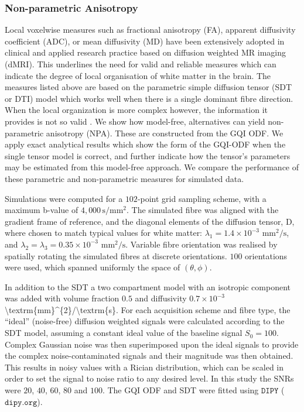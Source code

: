 \documentclass{bioinfo}
\begin{document}
\subsubsection{Non-parametric Anisotropy}

Local voxelwise measures such as fractional anisotropy (FA), apparent
diffusivity coefficient (ADC), or mean diffusivity (MD) have been
extensively adopted in clinical and applied research practice based
on diffusion weighted MR imaging (dMRI). This underlines the need
for valid and reliable measures which can indicate the degree of local
organisation of white matter in the brain. The measures listed above
are based on the parametric simple diffusion tensor (SDT or DTI) model
\cite{Basser1994} which works well when there is a single dominant
fibre direction. When the local organization is more complex however,
the information it provides is not so valid \cite{Yeh2010,Tuch2002ThesisMIT}.
We show how model-free, alternatives can yield non-parametric anisotropy
(NPA). These are constructed from the GQI ODF. We apply exact analytical
results which show the form of the GQI-ODF when the single tensor
model is correct, and further indicate how the tensor's parameters
may be estimated from this model-free approach. We compare the performance
of these parametric and non-parametric measures for simulated data.

Simulations were computed for a $102$-point grid sampling scheme,
with a maximum b-value of $4,000\,\textrm{s}/\textrm{mm}^{2}$. The
simulated fibre was aligned with the gradient frame of reference,
and the diagonal elements of the diffusion tensor, D, where chosen
to match typical values for white matter: $\lambda_{1}=1.4\times10^{-3}$
$\textrm{mm}^{2}/\textrm{s}$, and $\lambda_{2}=\lambda_{3}=0.35\times10^{-3}$
$\textrm{mm}^{2}/\textrm{s}$. Variable fibre orientation was realised
by spatially rotating the simulated fibres at discrete orientations.
$100$ orientations were used, which spanned uniformly the space of
$(\theta,\phi)$. 

In addition to the SDT a two compartment model with an isotropic component
was added with volume fraction $0.5$ and diffusivity $0.7\times10^{-3}$
\foreignlanguage{british}{\textbackslash{}textrm\{mm\}\textasciicircum{}\{2\}/\textbackslash{}textrm\{s\}}.
For each acquisition scheme and fibre type, the \textquotedblleft{}ideal\textquotedblright{}
(noise-free) diffusion weighted signals were calculated according
to the SDT model, assuming a constant ideal value of the baseline
signal $S_{0}=100$. Complex Gaussian noise was then superimposed
upon the ideal signals to provide the complex noise-contaminated signals
and their magnitude was then obtained. This results in noisy values
with a Rician distribution, which can be scaled in order to set the
signal to noise ratio to any desired level. In this study the SNRs
were $20$, $40$, $60$, $80$ and $100$. The GQI ODF and SDT were
fitted using $\texttt{DIPY}$ ($\texttt{dipy.org}$). 
\end{document}
